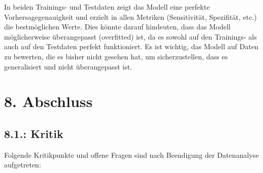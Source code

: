 \documentclass[
  letterpaper,
  DIV=11,
  numbers=noendperiod]{scrartcl}
\begin{document}
In beiden Trainings- und Testdaten zeigt das Modell eine perfekte
Vorhersagegenauigkeit und erzielt in allen Metriken (Sensitivität,
Spezifität, etc.) die bestmöglichen Werte. Dies könnte darauf hindeuten,
dass das Modell möglicherweise überangepasst (overfitted) ist, da es
sowohl auf den Trainings- als auch auf den Testdaten perfekt
funktioniert. Es ist wichtig, das Modell auf Daten zu bewerten, die es
bisher nicht gesehen hat, um sicherzustellen, dass es generalisiert und
nicht überangepasst ist.

\hypertarget{abschluss}{%
\section{8. Abschluss}\label{abschluss}}

\hypertarget{kritik}{%
\subsection{8.1.: Kritik}\label{kritik}}

Folgende Kritikpunkte und offene Fragen sind nach Beendigung der
Datenanalyse aufgetreten:
\end{document}

